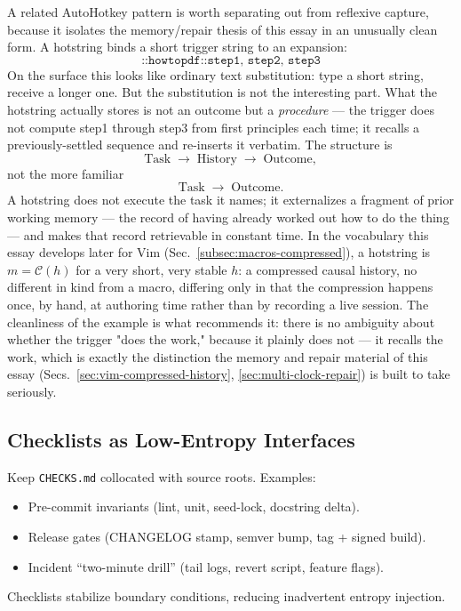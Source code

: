 \documentclass[12pt,a4paper]{article}
\theoremstyle{plain}
\theoremstyle{definition}
\theoremstyle{remark}
\begin{document}
A related AutoHotkey pattern is worth separating out from reflexive capture, because it isolates the memory/repair thesis of this essay in an unusually clean form. A hotstring binds a short trigger string to an expansion:
\[
\texttt{::howtopdf::step1, step2, step3}
\]
On the surface this looks like ordinary text substitution: type a short string, receive a longer one. But the substitution is not the interesting part. What the hotstring actually stores is not an outcome but a \emph{procedure} — the trigger does not compute step1 through step3 from first principles each time; it recalls a previously-settled sequence and re-inserts it verbatim. The structure is
\[
\text{Task} \;\to\; \text{History} \;\to\; \text{Outcome},
\]
not the more familiar
\[
\text{Task} \;\to\; \text{Outcome}.
\]
A hotstring does not execute the task it names; it externalizes a fragment of prior working memory — the record of having already worked out how to do the thing — and makes that record retrievable in constant time. In the vocabulary this essay develops later for Vim (Sec.~\ref{subsec:macros-compressed}), a hotstring is $m = \mathcal{C}(h)$ for a very short, very stable $h$: a compressed causal history, no different in kind from a macro, differing only in that the compression happens once, by hand, at authoring time rather than by recording a live session. The cleanliness of the example is what recommends it: there is no ambiguity about whether the trigger "does the work," because it plainly does not — it recalls the work, which is exactly the distinction the memory and repair material of this essay (Secs.~\ref{sec:vim-compressed-history}, \ref{sec:multi-clock-repair}) is built to take seriously.

\subsection{Checklists as Low-Entropy Interfaces}
Keep \verb|CHECKS.md| collocated with source roots. Examples:
\begin{itemize}
  \item Pre-commit invariants (lint, unit, seed-lock, docstring delta).
  \item Release gates (CHANGELOG stamp, semver bump, tag + signed build).
  \item Incident “two-minute drill” (tail logs, revert script, feature flags).
\end{itemize}
Checklists stabilize boundary conditions, reducing inadvertent entropy injection.

\end{document}
